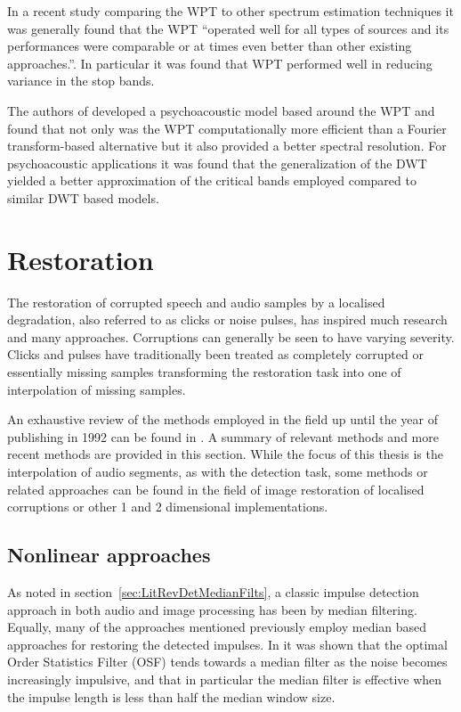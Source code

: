 In a recent study comparing the WPT to other spectrum estimation techniques it was generally found that the WPT ``operated well for all types of sources and its performances were comparable or at times even better than other existing approaches.''\cite{Ariananda2013}. In particular it was found that WPT performed well in reducing variance in the stop bands.

The authors of \cite{He2008} developed a psychoacoustic model based around the WPT and found that not only was the WPT computationally more efficient than a Fourier transform-based alternative but it also provided a better spectral resolution. For psychoacoustic applications it was found that the generalization of the DWT yielded a better approximation of the critical bands employed\cite{Carnero1999}\cite{He2008} compared to similar DWT based models\cite{Sinha1993}\cite{Zurera2001}.


\section{Restoration}\label{sec:LitRev_Restoration}
The restoration of corrupted speech and audio samples by a localised degradation, also referred to as clicks or noise pulses, has inspired much research and many approaches. Corruptions can generally be seen to have varying severity. Clicks and pulses have traditionally been treated as completely corrupted or essentially missing samples transforming the restoration task into one of interpolation of missing samples\cite{Tukey1974}\cite{Tukey1977}\cite{Godsill1998book}.

An exhaustive review of the methods employed in the field up until the year of publishing in 1992 can be found in \cite{Veldhuis1992}. A summary of relevant methods and more recent methods are provided in this section. While the focus of this thesis is the interpolation of audio segments, as with the detection task, some methods or related approaches can be found in the field of image restoration of localised corruptions or other 1 and 2 dimensional implementations.

\subsection{Nonlinear approaches}
As noted in section~\ref{sec:LitRevDetMedianFilts}, a classic impulse detection approach in both audio and image processing has been by median filtering. Equally, many of the approaches mentioned previously employ median based approaches for restoring the detected impulses\cite{Tukey1974}\cite{Lee1985}\cite{Heinonen1985}\cite{Heinonen1987}\cite{Maekivirta1991}\cite{Kasparis1993}\cite{Alajlan2004}. In \cite{Bovik1983} it was shown that the optimal Order Statistics Filter (OSF) tends towards a median filter as the noise becomes increasingly impulsive, and that in particular the median filter is effective when the impulse length is less than half the median window size\cite{Alajlan2004}.

